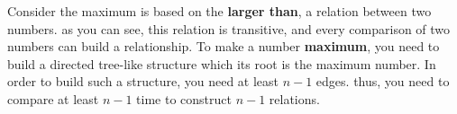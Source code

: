 Consider the maximum is based on the \textbf{larger than}, a relation between two numbers. as you can see, this relation is transitive, and every comparison of two numbers can build a relationship. To make a number \textbf{maximum}, you need to build a directed tree-like structure which its root is the maximum number. In order to build such a structure, you need at least $n- 1$ edges. thus, you need to compare at least $n-1$ time to construct $n-1$ relations. 